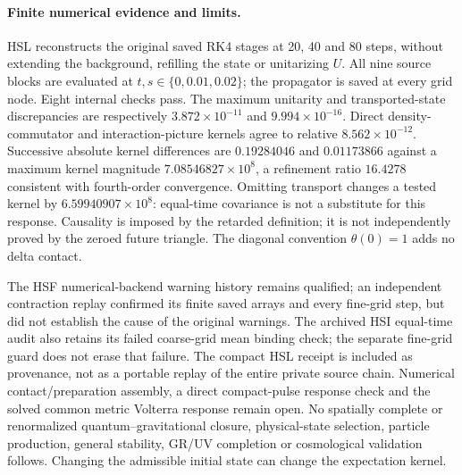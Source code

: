 \documentclass[11pt]{article}
\begin{document}
\paragraph{Finite numerical evidence and limits.}
HSL reconstructs the original saved RK4 stages at 20, 40 and 80 steps,
without extending the background, refilling the state or unitarizing $U$.
All nine source blocks are evaluated at $t,s\in\{0,0.01,0.02\}$;
the propagator is saved at every grid node. Eight internal checks pass.
The maximum unitarity and transported-state discrepancies are respectively
$3.872\times10^{-11}$ and $9.994\times10^{-16}$.
Direct density-commutator and interaction-picture kernels agree to relative
$8.562\times10^{-12}$.
Successive absolute kernel differences are $0.19284046$ and $0.01173866$
against a maximum kernel magnitude $7.08546827\times10^8$,
a refinement ratio $16.4278$ consistent with fourth-order convergence.
Omitting transport changes a tested kernel by $6.59940907\times10^8$:
equal-time covariance is not a substitute for this response.
Causality is imposed by the retarded definition; it is not independently
proved by the zeroed future triangle. The diagonal convention
$\theta(0)=1$ adds no delta contact.

The HSF numerical-backend warning history remains qualified; an independent
contraction replay confirmed its finite saved arrays and every fine-grid step,
but did not establish the cause of the original warnings.
The archived HSI equal-time audit also retains its failed coarse-grid mean
binding check; the separate fine-grid guard does not erase that failure.
The compact HSL receipt is included as provenance, not as a portable replay
of the entire private source chain.
Numerical contact/preparation assembly, a direct compact-pulse response check
and the solved common metric Volterra response remain open.
No spatially complete or renormalized quantum--gravitational closure,
physical-state selection, particle production, general stability,
GR/UV completion or cosmological validation follows.
Changing the admissible initial state can change the expectation kernel.
\end{document}
